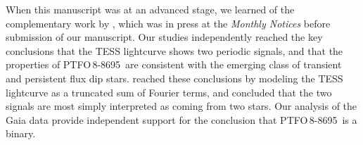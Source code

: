 \documentclass[12pt,twocolumn,tighten]{aastex62}
\newcommand{\ptfo}{PTFO$\,$8-8695}
\begin{document}

\acknowledgements
When this manuscript was at an advanced stage, we learned of the
complementary work by \citet{koen_2020}, which was in press at the
{\it Monthly Notices} before submission of our manuscript.  Our
studies independently reached the key conclusions that the TESS
lightcurve shows two periodic signals, and that the properties of
\ptfo\ are consistent with the emerging class of transient and
persistent flux dip stars.  \citet{koen_2020} reached these
conclusions by modeling the TESS lightcurve as a truncated sum of
Fourier terms, and concluded that the two signals are most simply
interpreted as coming from two stars.  Our analysis of the Gaia data
provide independent support for the conclusion that \ptfo\ is a
binary.
\end{document}
